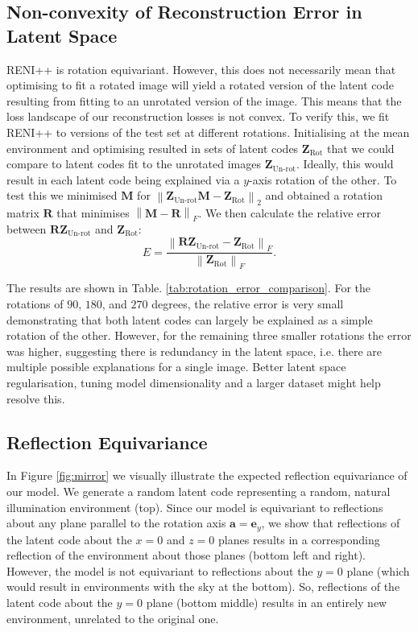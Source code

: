 \subsection{Non-convexity of Reconstruction Error in Latent Space}
\label{Non-convexity} 
RENI++ is rotation equivariant. However, this does not necessarily mean that optimising to fit a rotated image will yield a rotated version of the latent code resulting from fitting to an unrotated version of the image. This means that the loss landscape of our reconstruction losses is not convex. To verify this, we fit RENI++ to versions of the test set at different rotations. Initialising at the mean environment and optimising resulted in sets of latent codes $\mathbf{Z}_\text{Rot}$ that we could compare to latent codes fit to the unrotated images  $\mathbf{Z}_\text{Un-rot}$. Ideally, this would result in each latent code being explained via a $y$-axis rotation of the other. To test this we minimised $\mathbf{M}$ for $\left \| \mathbf{Z}_\text{Un-rot}\mathbf{M} - \mathbf{Z}_\text{Rot}  \right \|_{2}$ and obtained a rotation matrix $\mathbf{R}$ that minimises $\left \| \mathbf{M} - \mathbf{R} \right \|_{F}$. We then calculate the relative error between $\mathbf{R}\mathbf{Z}_\text{Un-rot}$ and $\mathbf{Z}_\text{Rot}$: 
\[
E = \frac{\left \| \mathbf{R}\mathbf{Z}_\text{Un-rot} - \mathbf{Z}_\text{Rot} \right \|_{F}}{\left \| \mathbf{Z}_\text{Rot} \right \|_{F}}.
\]

The results are shown in Table. \ref{tab:rotation_error_comparison}. For the rotations of $90$, $180$, and $270$ degrees, the relative error is very small demonstrating that both latent codes can largely be explained as a simple rotation of the other. However, for the remaining three smaller rotations the error was higher, suggesting there is redundancy in the latent space, i.e. there are multiple possible explanations for a single image. Better latent space regularisation, tuning model dimensionality and a larger dataset might help resolve this.


\subsection{Reflection Equivariance}

In Figure \ref{fig:mirror} we visually illustrate the expected reflection equivariance of our model. We generate a random latent code representing a random, natural illumination environment (top). Since our model is equivariant to reflections about any plane parallel to the rotation axis $\mathbf{a}=\mathbf{e}_y$, we show that reflections of the latent code about the $x=0$ and $z=0$ planes results in a corresponding reflection of the environment about those planes (bottom left and right). However, the model is not equivariant to reflections about the $y=0$ plane (which would result in environments with the sky at the bottom). So, reflections of the latent code about the $y=0$ plane (bottom middle) results in an entirely new environment, unrelated to the original one.

